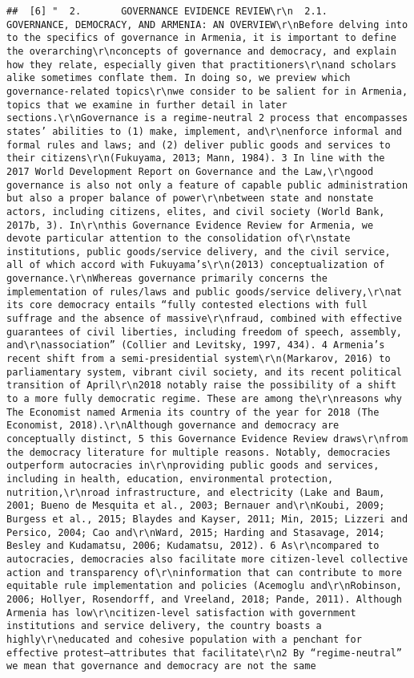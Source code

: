 \documentclass[
]{article}
\begin{document}
\begin{verbatim}
##  [6] "  2.       GOVERNANCE EVIDENCE REVIEW\r\n  2.1.       GOVERNANCE, DEMOCRACY, AND ARMENIA: AN OVERVIEW\r\nBefore delving into to the specifics of governance in Armenia, it is important to define the overarching\r\nconcepts of governance and democracy, and explain how they relate, especially given that practitioners\r\nand scholars alike sometimes conflate them. In doing so, we preview which governance-related topics\r\nwe consider to be salient for in Armenia, topics that we examine in further detail in later sections.\r\nGovernance is a regime-neutral 2 process that encompasses states’ abilities to (1) make, implement, and\r\nenforce informal and formal rules and laws; and (2) deliver public goods and services to their citizens\r\n(Fukuyama, 2013; Mann, 1984). 3 In line with the 2017 World Development Report on Governance and the Law,\r\ngood governance is also not only a feature of capable public administration but also a proper balance of power\r\nbetween state and nonstate actors, including citizens, elites, and civil society (World Bank, 2017b, 3). In\r\nthis Governance Evidence Review for Armenia, we devote particular attention to the consolidation of\r\nstate institutions, public goods/service delivery, and the civil service, all of which accord with Fukuyama’s\r\n(2013) conceptualization of governance.\r\nWhereas governance primarily concerns the implementation of rules/laws and public goods/service delivery,\r\nat its core democracy entails “fully contested elections with full suffrage and the absence of massive\r\nfraud, combined with effective guarantees of civil liberties, including freedom of speech, assembly, and\r\nassociation” (Collier and Levitsky, 1997, 434). 4 Armenia’s recent shift from a semi-presidential system\r\n(Markarov, 2016) to parliamentary system, vibrant civil society, and its recent political transition of April\r\n2018 notably raise the possibility of a shift to a more fully democratic regime. These are among the\r\nreasons why The Economist named Armenia its country of the year for 2018 (The Economist, 2018).\r\nAlthough governance and democracy are conceptually distinct, 5 this Governance Evidence Review draws\r\nfrom the democracy literature for multiple reasons. Notably, democracies outperform autocracies in\r\nproviding public goods and services, including in health, education, environmental protection, nutrition,\r\nroad infrastructure, and electricity (Lake and Baum, 2001; Bueno de Mesquita et al., 2003; Bernauer and\r\nKoubi, 2009; Burgess et al., 2015; Blaydes and Kayser, 2011; Min, 2015; Lizzeri and Persico, 2004; Cao and\r\nWard, 2015; Harding and Stasavage, 2014; Besley and Kudamatsu, 2006; Kudamatsu, 2012). 6 As\r\ncompared to autocracies, democracies also facilitate more citizen-level collective action and transparency of\r\ninformation that can contribute to more equitable rule implementation and policies (Acemoglu and\r\nRobinson, 2006; Hollyer, Rosendorff, and Vreeland, 2018; Pande, 2011). Although Armenia has low\r\ncitizen-level satisfaction with government institutions and service delivery, the country boasts a highly\r\neducated and cohesive population with a penchant for effective protest—attributes that facilitate\r\n2 By “regime-neutral” we mean that governance and democracy are not the same 
\end{verbatim}
\end{document}
